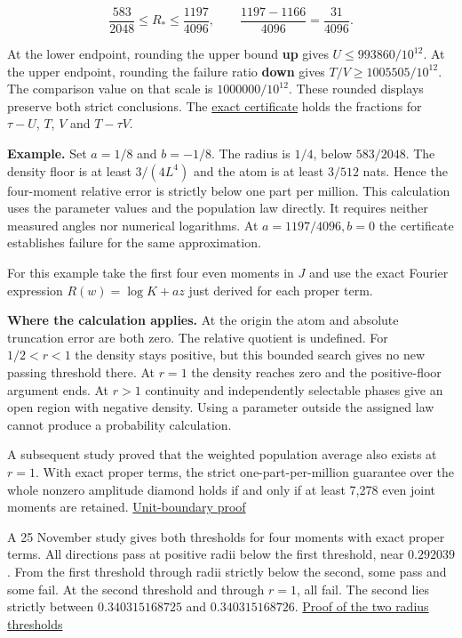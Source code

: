 \[
\frac{583}{2048}\le R_*\le\frac{1197}{4096},
\qquad \frac{1197-1166}{4096}=\frac{31}{4096}.
\]

At the lower endpoint, rounding the upper bound \textbf{up} gives \(U\le993860/10^{12}\). At the upper endpoint, rounding the failure ratio \textbf{down} gives \(T/V\ge1005505/10^{12}\). The comparison value on that scale is \(1000000/10^{12}\). These rounded displays preserve both strict conclusions. The \href{https://github.com/sepahead/pid-rs/blob/main/audit/research/angular-four-moment-radius/certificate.json}{exact certificate} holds the fractions for \(\tau-U\), \(T\), \(V\) and \(T-\tau V\).

\textbf{Example.} Set \(a=1/8\) and \(b=-1/8\). The radius is \(1/4\), below \(583/2048\). The density floor is at least \(3/(4L^4)\) and the atom is at least \(3/512\) nats. Hence the four-moment relative error is strictly below one part per million. This calculation uses the parameter values and the population law directly. It requires neither measured angles nor numerical logarithms. At \(a=1197/4096,b=0\) the certificate establishes failure for the same approximation.

For this example take the first four even moments in \(J\) and use the exact Fourier expression \(R(w)=\log K+az\) just derived for each proper term.

\textbf{Where the calculation applies.} At the origin the atom and absolute truncation error are both zero. The relative quotient is undefined. For \(1/2<r<1\) the density stays positive, but this bounded search gives no new passing threshold there. At \(r=1\) the density reaches zero and the positive-floor argument ends. At \(r>1\) continuity and independently selectable phases give an open region with negative density. Using a parameter outside the assigned law cannot produce a probability calculation.

A subsequent study proved that the weighted population average also exists at \(r=1\). With exact proper terms, the strict one-part-per-million guarantee over the whole nonzero amplitude diamond holds if and only if at least 7,278 even joint moments are retained. \href{https://github.com/sepahead/pid-rs/blob/main/audit/research/angular-unit-boundary/EXPOSITION.md}{Unit-boundary proof}

A 25 November study gives both thresholds for four moments with exact proper terms. All directions pass at positive radii below the first threshold, near \(0.292039\). From the first threshold through radii strictly below the second, some pass and some fail. At the second threshold and through \(r=1\), all fail. The second lies strictly between \(0.340315168725\) and \(0.340315168726\). \href{https://github.com/sepahead/pid-rs/blob/main/audit/research/angular-ray-monotonicity/EXPOSITION.md}{Proof of the two radius thresholds}

